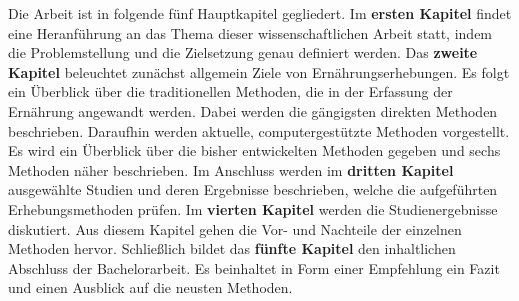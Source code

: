 Die Arbeit ist in folgende fünf Hauptkapitel gegliedert. Im \textbf{ersten Kapitel} findet eine Heranführung an das Thema dieser wissenschaftlichen Arbeit statt, indem die Problemstellung und die Zielsetzung genau definiert werden. Das \textbf{zweite Kapitel} beleuchtet zunächst allgemein Ziele von Ernährungserhebungen. Es folgt ein Überblick über die traditionellen Methoden, die in der Erfassung der Ernährung angewandt werden. Dabei werden die gängigsten direkten Methoden beschrieben. Daraufhin werden aktuelle, computergestützte Methoden vorgestellt. Es wird ein Überblick über die bisher entwickelten Methoden gegeben und sechs Methoden näher beschrieben. Im Anschluss werden im \textbf{dritten Kapitel} ausgewählte Studien und deren Ergebnisse beschrieben, welche die aufgeführten Erhebungsmethoden prüfen.  Im \textbf{vierten Kapitel} werden die Studienergebnisse diskutiert. Aus diesem Kapitel gehen die Vor- und Nachteile der einzelnen Methoden hervor. Schließlich bildet das \textbf{fünfte Kapitel} den inhaltlichen Abschluss der Bachelorarbeit. Es beinhaltet in Form einer Empfehlung ein Fazit und einen Ausblick auf die neusten Methoden.


